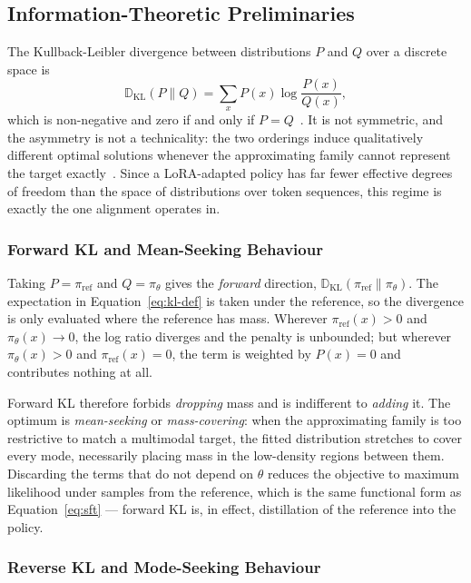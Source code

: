 \subsection{Information-Theoretic Preliminaries}
\label{sec:bg:kl}

The Kullback-Leibler divergence between distributions $P$ and $Q$ over a discrete space is
\begin{equation}\label{eq:kl-def}
\mathbb{D}_{\text{KL}}(P \parallel Q) = \sum_{x} P(x) \log \frac{P(x)}{Q(x)},
\end{equation}
which is non-negative and zero if and only if $P = Q$~\cite{kullback1951information}. It is not symmetric, and the asymmetry is not a technicality: the two orderings induce qualitatively different optimal solutions whenever the approximating family cannot represent the target exactly~\cite{minka2005divergence}. Since a LoRA-adapted policy has far fewer effective degrees of freedom than the space of distributions over token sequences, this regime is exactly the one alignment operates in.

\subsubsection{Forward KL and Mean-Seeking Behaviour}

Taking $P = \pi_{\text{ref}}$ and $Q = \pi_\theta$ gives the \emph{forward} direction, $\mathbb{D}_{\text{KL}}(\pi_{\text{ref}} \parallel \pi_\theta)$. The expectation in Equation~\ref{eq:kl-def} is taken under the reference, so the divergence is only evaluated where the reference has mass. Wherever $\pi_{\text{ref}}(x) > 0$ and $\pi_\theta(x) \to 0$, the log ratio diverges and the penalty is unbounded; but wherever $\pi_\theta(x) > 0$ and $\pi_{\text{ref}}(x) = 0$, the term is weighted by $P(x) = 0$ and contributes nothing at all.

Forward KL therefore forbids \emph{dropping} mass and is indifferent to \emph{adding} it. The optimum is \emph{mean-seeking} or \emph{mass-covering}: when the approximating family is too restrictive to match a multimodal target, the fitted distribution stretches to cover every mode, necessarily placing mass in the low-density regions between them. Discarding the terms that do not depend on $\theta$ reduces the objective to maximum likelihood under samples from the reference, which is the same functional form as Equation~\ref{eq:sft} --- forward KL is, in effect, distillation of the reference into the policy.

\subsubsection{Reverse KL and Mode-Seeking Behaviour}

